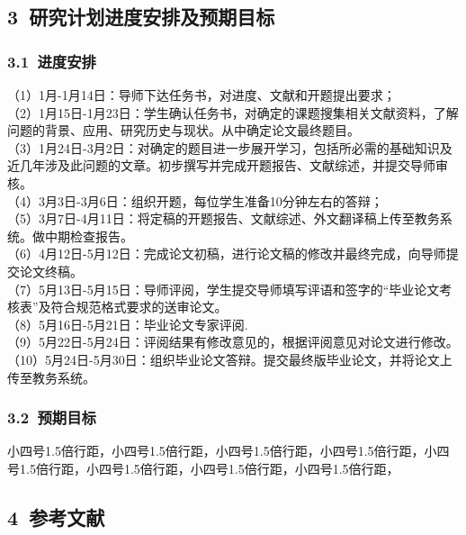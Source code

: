 \begin{spacing}{1.5}
\subsection{3~研究计划进度安排及预期目标}
        \subsubsection{3.1~进度安排}
        （1）1月-1月14日：导师下达任务书，对进度、文献和开题提出要求；\\
        （2）1月15日-1月23日：学生确认任务书，对确定的课题搜集相关文献资料，了解问题的背景、应用、研究历史与现状。从中确定论文最终题目。 \\
        （3）1月24日-3月2日：对确定的题目进一步展开学习，包括所必需的基础知识及近几年涉及此问题的文章。初步撰写并完成开题报告、文献综述，并提交导师审核。\\
        （4）3月3日-3月6日：组织开题，每位学生准备10分钟左右的答辩；\\
        （5）3月7日-4月11日：将定稿的开题报告、文献综述、外文翻译稿上传至教务系统。做中期检查报告。\\
        （6）4月12日-5月12日：完成论文初稿，进行论文稿的修改并最终完成，向导师提交论文终稿。\\
        （7）5月13日-5月15日：导师评阅，学生提交导师填写评语和签字的“毕业论文考核表”及符合规范格式要求的送审论文。\\
        （8）5月16日-5月21日：毕业论文专家评阅.\\
        （9）5月22日-5月24日：评阅结果有修改意见的，根据评阅意见对论文进行修改。\\
        （10）5月24日-5月30日：组织毕业论文答辩。提交最终版毕业论文，并将论文上传至教务系统。

        \subsubsection{3.2~预期目标}

        小四号1.5倍行距，小四号1.5倍行距，小四号1.5倍行距，小四号1.5倍行距，小四号1.5倍行距，小四号1.5倍行距，小四号1.5倍行距，小四号1.5倍行距，


\subsection{4~参考文献}
\end{spacing}

